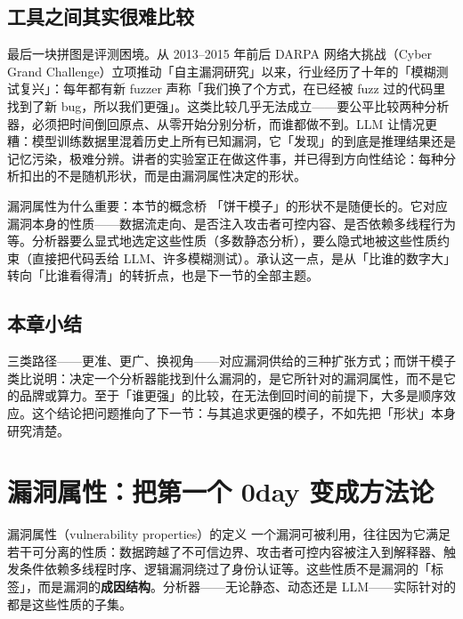 \documentclass[a4paper,11pt]{article}
\begin{document}
\subsection{工具之间其实很难比较}

最后一块拼图是评测困境。从 2013--2015 年前后 DARPA 网络大挑战（Cyber Grand Challenge）立项推动「自主漏洞研究」以来，行业经历了十年的「模糊测试复兴」：每年都有新 fuzzer 声称「我们换了个方式，在已经被 fuzz 过的代码里找到了新 bug，所以我们更强」。这类比较几乎无法成立——要公平比较两种分析器，必须把时间倒回原点、从零开始分别分析，而谁都做不到。LLM 让情况更糟：模型训练数据里混着历史上所有已知漏洞，它「发现」的到底是推理结果还是记忆污染，极难分辨。讲者的实验室正在做这件事，并已得到方向性结论：每种分析扣出的不是随机形状，而是由漏洞属性决定的形状。

\begin{knowledgebox}{漏洞属性为什么重要：本节的概念桥}
「饼干模子」的形状不是随便长的。它对应漏洞本身的性质——数据流走向、是否注入攻击者可控内容、是否依赖多线程行为等。分析器要么显式地选定这些性质（多数静态分析），要么隐式地被这些性质约束（直接把代码丢给 LLM、许多模糊测试）。承认这一点，是从「比谁的数字大」转向「比谁看得清」的转折点，也是下一节的全部主题。
\end{knowledgebox}

\subsection{本章小结}

三类路径——更准、更广、换视角——对应漏洞供给的三种扩张方式；而饼干模子类比说明：决定一个分析器能找到什么漏洞的，是它所针对的漏洞属性，而不是它的品牌或算力。至于「谁更强」的比较，在无法倒回时间的前提下，大多是顺序效应。这个结论把问题推向了下一节：与其追求更强的模子，不如先把「形状」本身研究清楚。

\section{漏洞属性：把第一个 0day 变成方法论}

\begin{importantbox}{漏洞属性（vulnerability properties）的定义}
一个漏洞可被利用，往往因为它满足若干可分离的性质：数据跨越了不可信边界、攻击者可控内容被注入到解释器、触发条件依赖多线程时序、逻辑漏洞绕过了身份认证等。这些性质不是漏洞的「标签」，而是漏洞的\textbf{成因结构}。分析器——无论静态、动态还是 LLM——实际针对的都是这些性质的子集。
\end{importantbox}
\end{document}
